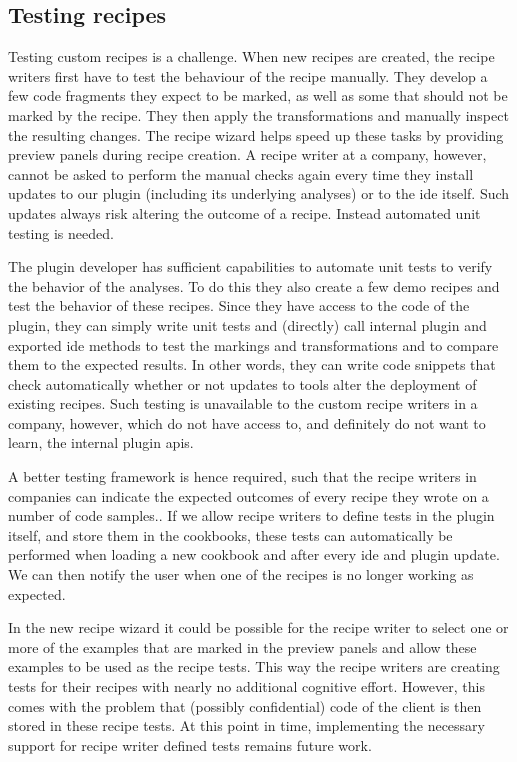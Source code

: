 \subsection{Testing recipes}
Testing custom recipes is a challenge.
When new recipes are created, the recipe writers first have to test the behaviour of the recipe manually.
They develop a few code fragments they expect to be marked, as well as some that should not be marked by the recipe.
They then apply the transformations and manually inspect the resulting changes.
The recipe wizard helps speed up these tasks by providing preview panels during recipe creation.
A recipe writer at a company, however, cannot be asked to perform the manual checks again every time they install updates to our plugin (including its underlying analyses) or to the \gls{ide} itself.
Such updates always risk altering the outcome of a recipe.
Instead automated unit testing is needed.

The plugin developer has sufficient capabilities to automate unit tests to verify the behavior of the analyses.
To do this they also create a few demo recipes and test the behavior of these recipes.
Since they have access to the code of the plugin, they can simply write unit tests and (directly) call internal plugin and exported \gls{ide} methods to test the markings and transformations and to compare them to the expected results.
In other words, they can write code snippets that check automatically whether or not updates to tools alter the deployment of existing recipes.
Such testing is unavailable to the custom recipe writers in a company, however, which do not have access to, and definitely do not want to learn, the internal plugin \glspl{api}.  

A better testing framework is hence required, such that the recipe writers in companies can indicate the expected outcomes of every recipe they wrote on a number of code samples.. 
If we allow recipe writers to define tests in the plugin itself, and store them in the cookbooks, these tests can automatically be performed when loading a new cookbook and after every \gls{ide} and plugin update.
We can then notify the user when one of the recipes is no longer working as expected.

In the new recipe wizard it could be possible for the recipe writer to select one or more of the examples that are marked in the preview panels and allow these examples to be used as the recipe tests.
This way the recipe writers are creating tests for their recipes with nearly no additional cognitive effort.
However, this comes with the problem that (possibly confidential) code of the client is then stored in these recipe tests.
At this point in time, implementing the necessary support for recipe writer defined tests remains future work.

